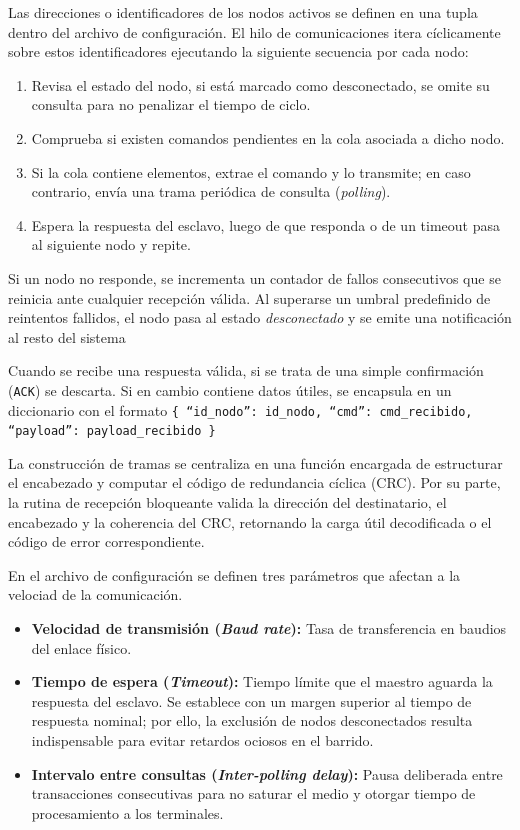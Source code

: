 Las direcciones o identificadores de los nodos activos se definen en una tupla dentro del archivo de configuración. El hilo de comunicaciones itera cíclicamente sobre estos identificadores ejecutando la siguiente secuencia por cada nodo:

\begin{enumerate}
    \item Revisa el estado del nodo, si está marcado como desconectado, se omite su consulta para no penalizar el tiempo de ciclo.
    \item Comprueba si existen comandos pendientes en la cola asociada a dicho nodo.
    \item Si la cola contiene elementos, extrae el comando y lo transmite; en caso contrario, envía una trama periódica de consulta (\textit{polling}).
    \item Espera la respuesta del esclavo, luego de que responda o de un timeout pasa al siguiente nodo y repite.
\end{enumerate}

Si un nodo no responde, se incrementa un contador de fallos consecutivos que se reinicia ante cualquier recepción válida. Al superarse un umbral predefinido de reintentos fallidos, el nodo pasa al estado \textit{desconectado} y se emite una notificación al resto del sistema

Cuando se recibe una respuesta válida, si se trata de una simple confirmación (\texttt{ACK}) se descarta. Si en cambio contiene datos útiles, se encapsula en un diccionario con el formato \texttt{\{
                        \enquote{id\_nodo}: id\_nodo,
                        \enquote{cmd}: cmd\_recibido,
                        \enquote{payload}: payload\_recibido
                    \}}

La construcción de tramas se centraliza en una función encargada de estructurar el encabezado y computar el código de redundancia cíclica (CRC). Por su parte, la rutina de recepción bloqueante valida la dirección del destinatario, el encabezado y la coherencia del CRC, retornando la carga útil decodificada o el código de error correspondiente.

En el archivo de configuración se definen tres parámetros que afectan a la velociad de la comunicación.
\begin{itemize}
\item \textbf{Velocidad de transmisión (\textit{Baud rate}):} Tasa de transferencia en baudios del enlace físico.
\item \textbf{Tiempo de espera (\textit{Timeout}):} Tiempo límite que el maestro aguarda la respuesta del esclavo. Se establece con un margen superior al tiempo de respuesta nominal; por ello, la exclusión de nodos desconectados resulta indispensable para evitar retardos ociosos en el barrido.
\item \textbf{Intervalo entre consultas (\textit{Inter-polling delay}):} Pausa deliberada entre transacciones consecutivas para no saturar el medio y otorgar tiempo de procesamiento a los terminales.
\end{itemize}


